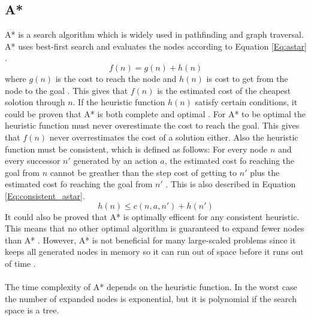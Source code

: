 \subsection{A*}
A* is a search algorithm which is widely used in pathfinding and graph traversal. A* uses best-first search and evaluates the nodes according to Equation \ref{Eq:astar} \citep{astar_ai}. 
\begin{equation}
f(n) = g(n) + h(n)
\label{Eq:astar}
\end{equation}
where $g(n)$ is the cost to reach the node and $h(n)$ is cost to get from the node to the goal \citep{astar_ai}. This gives that $f(n)$ is the estimated cost of the cheapest solotion through $n$. If the heuristic function $h(n)$ satisfy certain conditions, it could be proven that A* is both complete and optimal \citep{astar_ai}. For A* to be optimal the heuristic function must never overestimate the cost to reach the goal. This gives that $f(n)$ never overrestimates the cost of a solution either. Also the heuristic function must be consistent, which is defined as follows: For every node $n$ and every successor $n'$ generated by an action $a$, the estimated cost fo reaching the goal from $n$ cannot be greather than the step cost of getting to $n'$ plus the estimated cost fo reaching the goal from $n'$ \citep{astar_ai}. This is also described in Equation \ref{Eq:consistent_astar}.
\begin{equation}
h(n) \leq c(n, a, n') + h(n')
\label{Eq:consistent_astar}
\end{equation}
It could also be proved that A* is optimally efficent for any consistent heuristic. This means that no other optimal algorithm is guaranteed to expand fewer nodes than A* \citep{astar_ai}. However, A* is not beneficial for many large-scaled problems since it keeps all generated nodes in memory so it can run out of space before it runs out of time \citep{astar_ai}.\\\\
The time complexity of A* depends on the heuristic function. In the worst case the number of expanded nodes is exponential, but it is polynomial if the search space is a tree.
